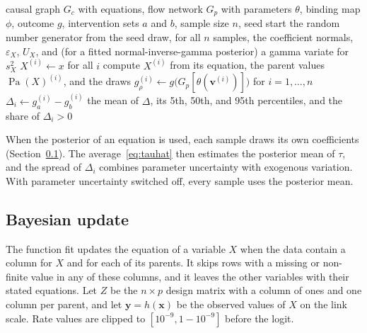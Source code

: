 \documentclass[12pt]{article}
\DeclareMathOperator{\Pa}{Pa}
\newcommand{\code}[1]{{\ttfamily\def\_{\textunderscore\allowbreak}#1}}
\theoremstyle{plain}
\theoremstyle{definition}
\begin{document}
\begin{algorithm}[htbp]
\caption{Estimate of $\tau(a,b)$ with shared exogenous noise}
\label{alg:compare}
\begin{algorithmic}[1]
\REQUIRE causal graph $G_c$ with equations, flow network $G_p$ with parameters $\theta$, binding map $\phi$, outcome $g$, intervention sets $a$ and $b$, sample size $n$, seed
    \STATE start the random number generator from the seed
        \STATE draw, for all $n$ samples, the coefficient normals, $\varepsilon_X$, $U_X$, and (for a fitted normal-inverse-gamma posterior) a gamma variate for $s_X^2$
            \STATE $X^{(i)}\gets x$ for all $i$
        \ELSE
            \STATE compute $X^{(i)}$ from its equation, the parent values $\Pa(X)^{(i)}$, and the draws
        \ENDIF
    \ENDFOR
    \STATE $g_\rho^{(i)}\gets g\bigl(G_p[\theta(\mathbf{v}^{(i)})]\bigr)$ for $i=1,\dots,n$
\ENDFOR
\STATE $\Delta_i\gets g_a^{(i)}-g_b^{(i)}$
\RETURN the mean of $\Delta$, its 5th, 50th, and 95th percentiles, and the share of $\Delta_i>0$
\end{algorithmic}
\end{algorithm}

When the posterior of an equation is used, each sample draws its own coefficients (Section~\ref{sec:update}). The average~\eqref{eq:tauhat} then estimates the posterior mean of $\tau$, and the spread of $\Delta_i$ combines parameter uncertainty with exogenous variation. With parameter uncertainty switched off, every sample uses the posterior mean.

\subsection{Bayesian update}\label{sec:update}

The function \code{fit} updates the equation of a variable $X$ when the data contain a column for $X$ and for each of its parents. It skips rows with a missing or non-finite value in any of these columns, and it leaves the other variables with their stated equations. Let $Z$ be the $n\times p$ design matrix with a column of ones and one column per parent, and let $\mathbf{y}=h(\mathbf{x})$ be the observed values of $X$ on the link scale. Rate values are clipped to $[10^{-9},1-10^{-9}]$ before the logit.
\end{document}
